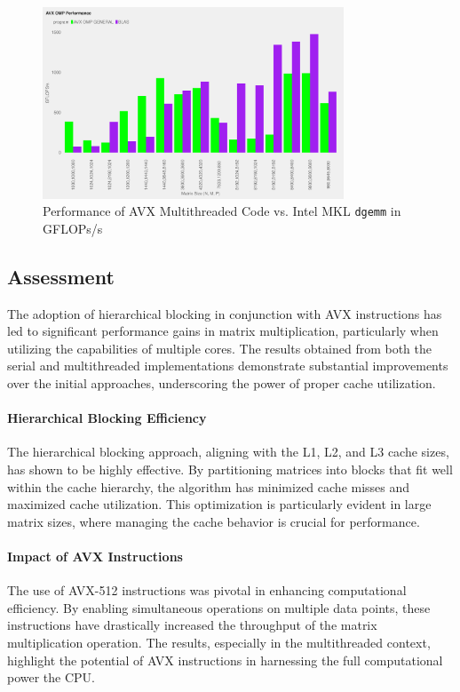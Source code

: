 \documentclass{article}
\begin{document}
\begin{figure}[H]
    \centering
    \includegraphics[width=0.8\textwidth]{../../project/out/avx-omp-non-divisible-gflops.pdf}
    \caption{Performance of AVX Multithreaded Code vs. Intel MKL \texttt{dgemm} in GFLOPs/s}
    \label{FIG:AVX-OMP-GENERAL-GFLOPS}
\end{figure}

\subsection{Assessment}
The adoption of hierarchical blocking in conjunction with AVX instructions has 
led to significant performance gains in matrix multiplication, particularly when utilizing the capabilities 
of multiple cores. The results obtained from both the serial and multithreaded implementations demonstrate 
substantial improvements over the initial approaches, underscoring the power of proper cache utilization.

\paragraph*{Hierarchical Blocking Efficiency} The hierarchical blocking approach, 
aligning with the L1, L2, and L3 cache sizes, has shown to be highly effective. 
By partitioning matrices into blocks that fit well within the cache hierarchy, 
the algorithm has minimized cache misses and maximized cache utilization. 
This optimization is particularly evident in large matrix sizes, where managing the cache behavior is crucial for performance.

\paragraph*{Impact of AVX Instructions} The use of AVX-512 instructions was pivotal 
in enhancing computational efficiency. By enabling simultaneous operations on multiple data points, 
these instructions have drastically increased the throughput of the matrix multiplication operation. 
The results, especially in the multithreaded context, highlight the potential of AVX instructions in harnessing 
the full computational power the CPU.
\end{document}

